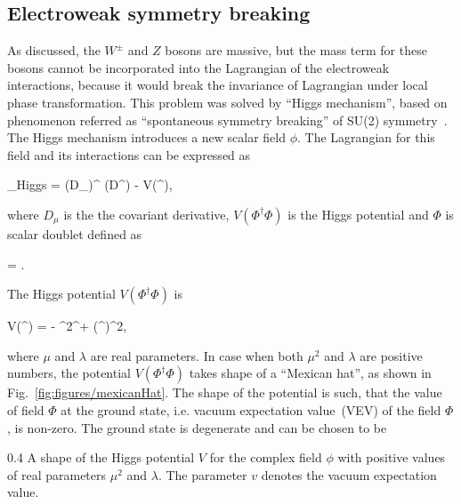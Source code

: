 


\subsection{Electroweak symmetry breaking~\label{sec:EWbreaking}}

As discussed, the $W^{\pm}$ and $Z$ bosons are massive, but the mass term for these bosons cannot be incorporated into the Lagrangian of the electroweak interactions, because it would break the invariance of Lagrangian under local phase transformation. This problem was solved by ``Higgs mechanism'', based on phenomenon referred as ``spontaneous symmetry breaking'' of SU(2) symmetry~\cite{Englert:1964et, Higgs:1964ia, Guralnik:1964eu}. The Higgs mechanism introduces a new scalar field $\phi$. The Lagrangian for this field and its interactions can be expressed as 

{
    _{Higgs} =  (D_{\mu}\Phi)^{\dagger} (D^{\mu}\Phi) - V(\Phi^{\dagger}\Phi),
}

where $D_{\mu}$ is the the covariant derivative, $V(\Phi^{\dagger}\Phi)$ is the Higgs potential and $\Phi$ is scalar doublet defined as


{
    \Phi = .
}

The Higgs potential $V(\Phi^{\dagger}\Phi)$ is

{
    V(\Phi^{\dagger}\Phi) =  -  \mu^{2}\Phi^{\dagger}\Phi +  \lambda(\Phi^{\dagger}\Phi)^{2},
}



where $\mu$ and $\lambda$ are real parameters. In case when both $\mu^{2}$ and $\lambda$ are positive numbers, the potential $V(\Phi^{\dagger}\Phi)$ takes shape of a ``Mexican hat'', as shown in Fig.~\ref{fig:figures/mexicanHat}. The shape of the potential is such, that the value of field $\Phi$ at the ground state, i.e. vacuum expectation value~(VEV) of the field $\Phi$, is non-zero. The ground state is degenerate and can be chosen to be

                 {0.4}       %
                 { A shape of the Higgs potential $V$ for the complex field $\phi$ with positive values of real parameters $\mu^{2}$ and $\lambda$. The parameter $v$ denotes the vacuum expectation value.}

